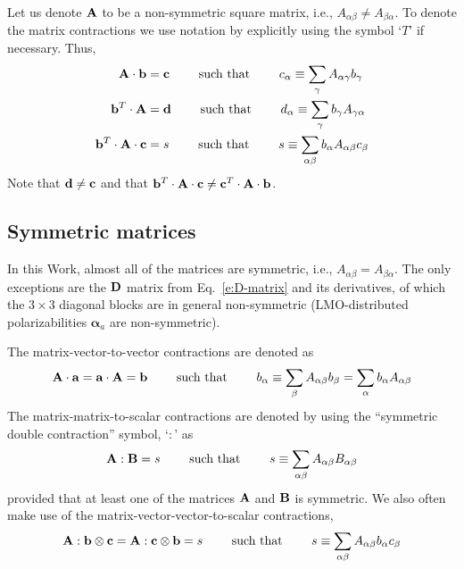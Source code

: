 \documentclass[a4paper,titlepage,twoside,fleqn,12pt]{book}
\newcommand{\BM}[1]{\bm{#1}}
\begin{document}
\begin{appendices}
Let us denote ${\bf A}$ to be a non-symmetric square matrix, i.e., 
$A_{\alpha\beta}\ne A_{\beta\alpha}$. To denote the matrix contractions
we use notation by explicitly using the symbol `$T$' if necessary.
Thus,
%
\begin{subequations}
\begin{align}
 {\bf A} \cdot {\bf b} &= {\bf c}
 \qquad\text{ such that } 
 \qquad c_{\alpha}  \equiv \sum_\gamma A_{\alpha\gamma} b_{\gamma} 
%
\\
{\bf b}^T \cdot {\bf A}   &= {\bf d}
 \qquad\text{ such that } 
 \qquad d_{\alpha}  \equiv \sum_\gamma b_{\gamma} A_{\gamma\alpha}
%
\\
{\bf b}^T \cdot {\bf A} \cdot {\bf c}  &= s
 \qquad\text{ such that } 
 \qquad s \equiv \sum_{\alpha\beta} b_{\alpha} A_{\alpha\beta} c_{\beta}
\end{align}
\end{subequations}
%
Note that ${\bf d} \ne {\bf c}$ and that 
${\bf b}^T \cdot {\bf A} \cdot {\bf c} \ne {\bf c}^T \cdot {\bf A} \cdot {\bf b}$.

\subsection{Symmetric matrices}

In this Work, almost all of the matrices are symmetric, i.e., 
$A_{\alpha\beta}= A_{\beta\alpha}$. The only exceptions
are the ${\bf D}$ matrix from Eq.~\eqref{e:D-matrix} 
and its derivatives, of which the $3\times 3$ diagonal blocks
are in general non-symmetric (LMO\hyp{}distributed polarizabilities ${\BM \alpha}_a$
are non\hyp{}symmetric). 

The matrix\hyp{}vector\hyp{}to\hyp{}vector contractions are denoted as
%
\begin{equation}
 {\bf A} \cdot {\bf a} = {\bf a} \cdot {\bf A} = {\bf b} 
 \qquad\text{ such that } 
 \qquad b_\alpha \equiv \sum_{\beta} A_{\alpha\beta} b_{\beta} = \sum_{\alpha} b_{\alpha} A_{\alpha\beta} 
\end{equation}
%
The matrix\hyp{}matrix\hyp{}to\hyp{}scalar 
contractions are denoted
by using the ``symmetric double contraction''
symbol, `$:$' as
%
\begin{equation}
 {\bf A} : {\bf B} = s \qquad\text{ such that } 
                                   \qquad s \equiv \sum_{\alpha\beta} A_{\alpha\beta} B_{\alpha\beta}
\end{equation}
%
provided that at least one of the matrices ${\bf A}$ and ${\bf B}$ is symmetric.
We also often make use of the matrix\hyp{}vector\hyp{}vector\hyp{}to\hyp{}scalar contractions,
%
\begin{equation}
 {\bf A} : {\bf b} \otimes {\bf c} = {\bf A} : {\bf c} \otimes {\bf b} = s
 \qquad\text{ such that } 
 \qquad s \equiv \sum_{\alpha\beta} A_{\alpha\beta} b_{\alpha} c_{\beta}
\end{equation}
%


\end{appendices}
\end{document}
